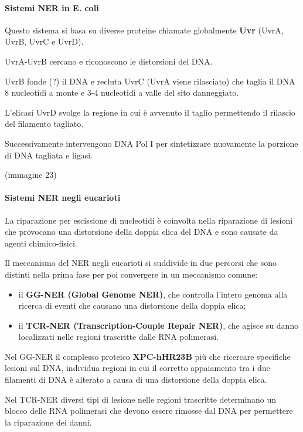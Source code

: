 \documentclass[]{article}
\begin{document}
\paragraph{Sistemi NER in E. coli}\label{sistemi-ner-in-e.-coli}

Questo sistema si basa su diverse proteine chiamate globalmente
\textbf{Uvr} (UvrA, UvrB, UvrC e UvrD).

UvrA-UvrB cercano e riconoscono le distorsioni del DNA.

UvrB fonde (?) il DNA e recluta UvrC (UvrA viene rilasciato) che taglia
il DNA 8 nucleotidi a monte e 3-4 nucleotidi a valle del sito
danneggiato.

L'elicasi UvrD svolge la regione in cui è avvenuto il taglio permettendo
il rilascio del filamento tagliato.

Successivamente intervengono DNA Pol I per sintetizzare nuovamente la
porzione di DNA tagliata e ligasi.

(immagine 23)

\paragraph{Sistemi NER negli
eucarioti}\label{sistemi-ner-negli-eucarioti}

La riparazione per escissione di nucleotidi è coinvolta nella
riparazione di lesioni che provocano una distorsione della doppia elica
del DNA e sono causate da agenti chimico-fisici.

Il meccanismo del NER negli eucarioti si suddivide in due percorsi che
sono distinti nella prima fase per poi convergere in un meccanismo
comune:

\begin{itemize}
\itemsep1pt\parskip0pt
\item
  il \textbf{GG-NER (Global Genome NER)}, che controlla l'intero genoma
  alla ricerca di eventi che causano una distorsione della doppia elica;
\item
  il \textbf{TCR-NER (Transcription-Couple Repair NER)}, che agisce su
  danno localizzati nelle regioni trascritte dalle RNA polimerasi.
\end{itemize}

Nel GG-NER il complesso proteico \textbf{XPC-hHR23B} più che ricercare
specifiche lesioni sul DNA, individua regioni in cui il corretto
appaiamento tra i due filamenti di DNA è alterato a causa di una
distorsione della doppia elica.

Nel TCR-NER diversi tipi di lesione nelle regioni trascritte determinano
un blocco delle RNA polimerasi che devono essere rimosse dal DNA per
permettere la riparazione dei danni.
\end{document}
